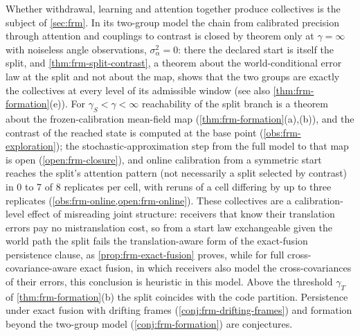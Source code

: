 Whether withdrawal, learning and attention together produce collectives is the subject of \cref{sec:frm}. In its two-group model the chain from calibrated precision through attention and couplings to contrast is closed by theorem only at $\gamma=\infty$ with noiseless angle observations, $\sigma_\alpha^2=0$: there the declared start is itself the split, and \cref{thm:frm-split-contrast}, a theorem about the world-conditional error law at the split and not about the map, shows that the two groups are exactly the collectives at every level of its admissible window (see also \cref{thm:frm-formation}(e)). For $\gamma_S<\gamma<\infty$ reachability of the split branch is a theorem about the frozen-calibration mean-field map (\cref{thm:frm-formation}(a),(b)), and the contrast of the reached state is computed at the base point (\cref{obs:frm-exploration}); the stochastic-approximation step from the full model to that map is open (\cref{open:frm-closure}), and online calibration from a symmetric start reaches the split's attention pattern (not necessarily a split selected by contrast) in 0 to 7 of 8 replicates per cell, with reruns of a cell differing by up to three replicates (\cref{obs:frm-online,open:frm-online}). These collectives are a calibration-level effect of misreading joint structure: receivers that know their translation errors pay no mistranslation cost, so from a start law exchangeable given the world path the split fails the translation-aware form of the exact-fusion persistence clause, as \cref{prop:frm-exact-fusion} proves, while for full cross-covariance-aware exact fusion, in which receivers also model the cross-covariances of their errors, this conclusion is heuristic in this model. Above the threshold $\gamma_T$ of \cref{thm:frm-formation}(b) the split coincides with the code partition. Persistence under exact fusion with drifting frames (\cref{conj:frm-drifting-frames}) and formation beyond the two-group model (\cref{conj:frm-formation}) are conjectures.
